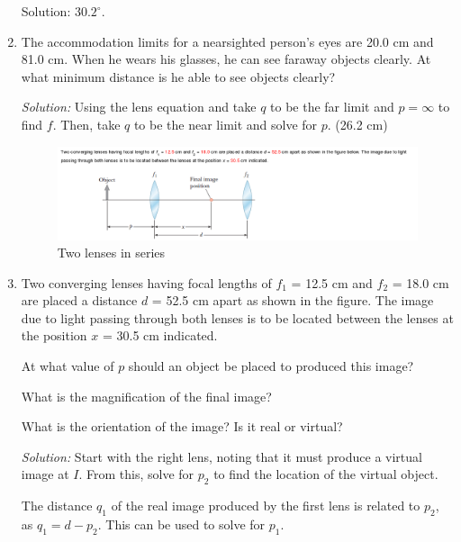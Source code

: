 \documentclass[a4paper,10pt]{report}
\begin{document}
\begin{enumerate}
  Solution: $30.2^{\circ}$.

  \item
    The accommodation limits for a nearsighted person's eyes are 20.0 cm and 81.0 cm. When he wears his glasses, he can see faraway objects clearly. At what minimum distance is he able to see objects clearly?

    \textit{Solution:} Using the lens equation and take $q$ to be the far limit and  $p=\infty$ to find $f$. Then, take $q$ to be the near limit and solve for $p$.
    (26.2 cm)

    \begin{figure}[h!]
    \begin{centering}
    \begin{center}
    \includegraphics[width=\linewidth]{./hw_double_lenses.png}
    \caption{Two lenses in series}
    \label{fig:hw_double_lenses}
    \end{center}
    \par\end{centering}
    \end{figure}

    \item
      Two converging lenses having focal lengths of $f_1$ = 12.5 cm and $f_2$ = 18.0 cm are placed a distance $d$ = 52.5 cm apart as shown in the figure. The image due to light passing through both lenses is to be located between the lenses at the position $x$ = 30.5 cm indicated.

      At what value of $p$ should an object be placed to produced this image?

      What is the magnification of the final image?

      What is the orientation of the image? Is it real or virtual?

      \hrulefill

      \textit{Solution:}
      Start with the right lens, noting that it must produce a virtual image at $I$. From this, solve for $p_2$ to find the location of the virtual object.

      The distance $q_1$ of the real image produced by the first lens is related to $p_2$, as $q_1 = d - p_2$. This can be used to solve for $p_1$.


\end{enumerate}
\end{document}
